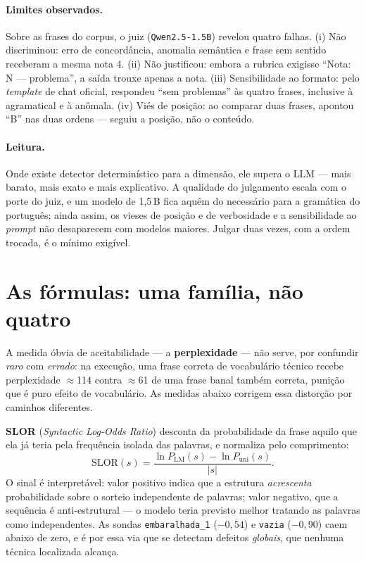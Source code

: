 \documentclass[11pt,a4paper]{article}
\begin{document}
\paragraph{Limites observados.} Sobre as frases do corpus, o juiz (\texttt{Qwen2.5-1.5B}) revelou
quatro falhas. (i) Não discriminou: erro de concordância, anomalia semântica e frase sem sentido
receberam a mesma nota 4. (ii) Não justificou: embora a rubrica exigisse ``Nota: N --- problema'', a
saída trouxe apenas a nota. (iii) Sensibilidade ao formato: pelo \textit{template} de chat oficial,
respondeu ``sem problemas'' às quatro frases, inclusive à agramatical e à anômala. (iv) Viés de
posição: ao comparar duas frases, apontou ``B'' nas duas ordens --- seguiu a posição, não o
conteúdo.

\paragraph{Leitura.} Onde existe detector determinístico para a dimensão, ele supera o LLM --- mais
barato, mais exato e mais explicativo. A qualidade do julgamento escala com o porte do juiz, e um
modelo de 1,5\,B fica aquém do necessário para a gramática do português; ainda assim, os vieses de
posição e de verbosidade e a sensibilidade ao \textit{prompt} não desaparecem com modelos maiores.
Julgar duas vezes, com a ordem trocada, é o mínimo exigível.

\section{As fórmulas: uma família, não quatro}
\label{sec:formulas}

A medida óbvia de aceitabilidade --- a \textbf{perplexidade} --- não serve, por confundir \emph{raro}
com \emph{errado}: na execução, uma frase correta de vocabulário técnico recebe perplexidade
$\approx$114 contra $\approx$61 de uma frase banal também correta, punição que é puro efeito de
vocabulário. As medidas abaixo corrigem essa distorção por caminhos diferentes.

\textbf{SLOR} (\textit{Syntactic Log-Odds Ratio}) desconta da probabilidade da frase aquilo que ela
já teria pela frequência isolada das palavras, e normaliza pelo comprimento:
\begin{equation}
\mathrm{SLOR}(s) = \frac{\ln P_{\mathrm{LM}}(s) - \ln P_{\mathrm{uni}}(s)}{|s|}.
\label{eq:slor}
\end{equation}
O sinal é interpretável: valor positivo indica que a estrutura \emph{acrescenta} probabilidade sobre
o sorteio independente de palavras; valor negativo, que a sequência é anti-estrutural --- o modelo
teria previsto melhor tratando as palavras como independentes. As sondas
\texttt{embaralhada\_1} ($-0{,}54$) e \texttt{vazia} ($-0{,}90$) caem abaixo de zero, e é por essa
via que se detectam defeitos \emph{globais}, que nenhuma técnica localizada alcança.
\end{document}
